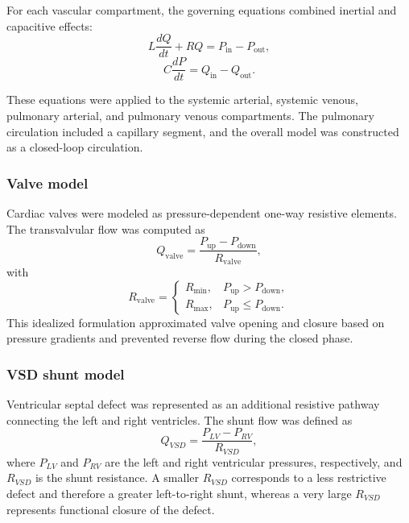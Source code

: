 \documentclass{article}
\begin{document}
For each vascular compartment, the governing equations combined inertial and capacitive effects:
\begin{equation}
L \frac{dQ}{dt} + RQ = P_{\mathrm{in}} - P_{\mathrm{out}},
\label{eq:vascular_flow}
\end{equation}
\begin{equation}
C \frac{dP}{dt} = Q_{\mathrm{in}} - Q_{\mathrm{out}}.
\label{eq:vascular_pressure}
\end{equation}

These equations were applied to the systemic arterial, systemic venous, pulmonary arterial, and pulmonary venous compartments. The pulmonary circulation included a capillary segment, and the overall model was constructed as a closed-loop circulation.

\subsubsection{Valve model}

Cardiac valves were modeled as pressure-dependent one-way resistive elements. The transvalvular flow was computed as
\begin{equation}
Q_{\mathrm{valve}} = \frac{P_{\mathrm{up}} - P_{\mathrm{down}}}{R_{\mathrm{valve}}},
\label{eq:qvalve}
\end{equation}
with
\begin{equation}
R_{\mathrm{valve}} =
\begin{cases}
R_{\min}, & P_{\mathrm{up}} > P_{\mathrm{down}},\\
R_{\max}, & P_{\mathrm{up}} \leq P_{\mathrm{down}}.
\end{cases}
\label{eq:valve_piecewise}
\end{equation}
This idealized formulation approximated valve opening and closure based on pressure gradients and prevented reverse flow during the closed phase.

\subsubsection{VSD shunt model}

Ventricular septal defect was represented as an additional resistive pathway connecting the left and right ventricles. The shunt flow was defined as
\begin{equation}
Q_{VSD} = \frac{P_{LV} - P_{RV}}{R_{VSD}},
\label{eq:qvsd}
\end{equation}
where $P_{LV}$ and $P_{RV}$ are the left and right ventricular pressures, respectively, and $R_{VSD}$ is the shunt resistance. A smaller $R_{VSD}$ corresponds to a less restrictive defect and therefore a greater left-to-right shunt, whereas a very large $R_{VSD}$ represents functional closure of the defect.
\end{document}
